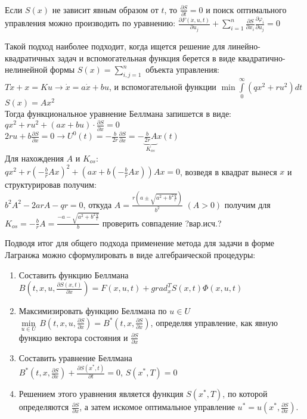 \documentclass[preprint,russian,a5paper,10pt,twoside,mediummath]{ncc}
\begin{document}
\\Если $S\left( x \right)$ не зависит явным образом от $t$, то $\frac{\partial S}{\partial t}=0$ и поиск оптимального управления можно производить по уравнению: $\frac{\partial F\left( \dot{x},u,t \right)}{\partial {{u}_{j}}}+\sum\limits_{i=1}^{n}{\frac{\partial S}{\partial {{x}_{i}}}\frac{\partial {{\varphi }_{i}}}{\partial {{u}_{j}}}}=0$ 
\par Такой подход наиболее подходит, когда ищется решение для линейно-квадратичных задач и вспомогательная функция берется в виде квадратично-нелинейной формы $S\left( x \right)=\sum\limits_{i,j=1}^{n}{{}}$ объекта управления: $T\dot{x}+x=Ku\to \dot{x}=a\dot{x}+bu$, и вспомогательной функции $\min \int\limits_{0}^{\infty }{\left( q{{x}^{2}}+r{{u}^{2}} \right)}dt$ $S\left( x \right)=A{{x}^{2}}$
\\Тогда функциональное уравнение Беллмана запишется в виде:
\\$q{{x}^{2}}+r{{u}^{2}}+\left( ax+bu \right)\cdot \frac{\partial S}{\partial x}=0$
\\$2ru+b\frac{\partial S}{\partial x}=0\to {{U}^{0}}\left( t \right)=-\frac{b}{2r}\frac{\partial S}{\partial x}=-\underbrace{\frac{b}{2r}A}_{{{K}_{os}}}x\left( t \right)$
\\Для нахождения $A$ и ${{K}_{os}}$:
\\$q{{x}^{2}}+r{{\left( -\frac{b}{r}Ax \right)}^{2}}+\left( ax+b\left( -\frac{b}{r}Ax \right) \right)Ax=0$, возведя в квадрат вынеся $x$ и структурировав получим:
\\${{b}^{2}}{{A}^{2}}-2arA-qr=0$, откуда $A=\frac{r\left( a\pm \sqrt{{{a}^{2}}+{{b}^{2}}\frac{q}{r}} \right)}{{{b}^{2}}}$ $\left( A>0 \right)$ получим для ${{K}_{os}}=-\frac{b}{r}A=\frac{-a-\sqrt{{{a}^{2}}+{{b}^{2}}\frac{q}{r}}}{b}$ проверить совпадение ?вар.исч.?
\par Подводя итог для общего подхода применение метода для задачи в форме Лагранжа можно сформулировать в виде алгебраической процедуры:
\begin{enumerate}
\item Составить функцию Беллмана
\\$B\left( t,x,u,\frac{\partial S\left( x,t \right)}{\partial x} \right)=F\left( x,u,t \right)+grad_{x}^{T}S\left( x,t \right)\Phi \left( x,u,t \right)$
\item Максимизировать функцию Беллмана по $u\in U$
\\$\underset{u\in U}{\mathop{\min }}\,B\left( t,x,u,\frac{\partial S}{\partial x} \right)={{B}^{*}}\left( t,x,\frac{\partial S}{\partial x} \right)$, определяя управление, как явную функцию вектора состояния и $\frac{\partial S}{\partial x}$
\item Составить уравнение Беллмана 
\\${{B}^{*}}\left( t,x,\frac{\partial S}{\partial x} \right)+\frac{\partial S\left( {{x}^{*}},t \right)}{\partial t}=0$, $S\left( {{x}^{*}},T \right)=0$
\item Решением этого уравнения является функция $S\left( {{x}^{*}},T \right)$, по которой определяются  $\frac{\partial S}{\partial x}$, а затем искомое оптимальное управление  ${{u}^{*}}=u\left( {{x}^{*}},\frac{\partial S}{\partial x} \right)$.
\end{enumerate} 
\end{document}
